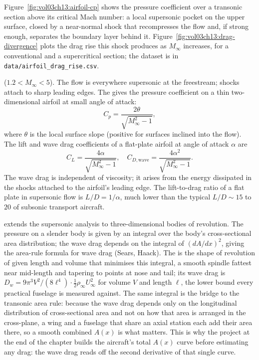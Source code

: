 



Figure~\ref{fig:vol03ch13:airfoil-cp} shows the pressure coefficient
over a transonic section above its critical Mach number: a local
supersonic pocket on the upper surface, closed by a near-normal shock
that recompresses the flow and, if strong enough, separates the
boundary layer behind it. Figure~\ref{fig:vol03ch13:drag-divergence}
plots the drag rise this shock produces as $M_\infty$ increases, for a
conventional and a supercritical section; the dataset is in
\texttt{data/airfoil\_drag\_rise.csv}.

 ($1.2 < M_\infty < 5$). The
flow is everywhere supersonic at the freestream; shocks attach to
sharp leading edges. The 
gives the pressure coefficient on a thin two-dimensional airfoil
at small angle of attack:
\[
C_p = \frac{2\theta}{\sqrt{M_\infty^2 - 1}},
\]
where $\theta$ is the local surface slope (positive for surfaces
inclined into the flow). The lift and wave drag coefficients of a
flat-plate airfoil at angle of attack $\alpha$ are
\[
C_L = \frac{4\alpha}{\sqrt{M_\infty^2 - 1}}, \quad
C_{D,\text{wave}} = \frac{4\alpha^2}{\sqrt{M_\infty^2 - 1}}.
\]
The wave drag is independent of viscosity; it arises from the
energy dissipated in the shocks attached to the airfoil's leading
edge. The lift-to-drag ratio of a flat plate in supersonic flow
is $L/D = 1/\alpha$, much lower than the typical $L/D \sim 15$ to
$20$ of subsonic transport aircraft.

 extends the supersonic analysis to
three-dimensional bodies of revolution. The pressure on a slender
body is given by an integral over the body's cross-sectional area
distribution; the wave drag depends on the integral of $(dA/dx)^2$,
giving the area-rule formula for wave drag (Sears, Haack). The
 is the shape of revolution of given length
and volume that minimises this integral, a smooth spindle fattest near
mid-length and tapering to points at nose and tail; its wave drag is
$D_w = 9\pi^3 V^2/(8 \ell^4) \cdot \tfrac{1}{2}\rho_\infty U_\infty^2$
for volume $V$ and length $\ell$, the lower bound every practical
fuselage is measured against. The same integral is the bridge to the
transonic area rule: because the wave drag depends only on the
longitudinal distribution of cross-sectional area and not on how that
area is arranged in the cross-plane, a wing and a fuselage that share
an axial station each add their area there, so a smooth combined
$A(x)$ is what matters. This is why the project at the end of the
chapter builds the aircraft's total $A(x)$ curve before estimating any
drag: the wave drag reads off the second derivative of that single
curve.

